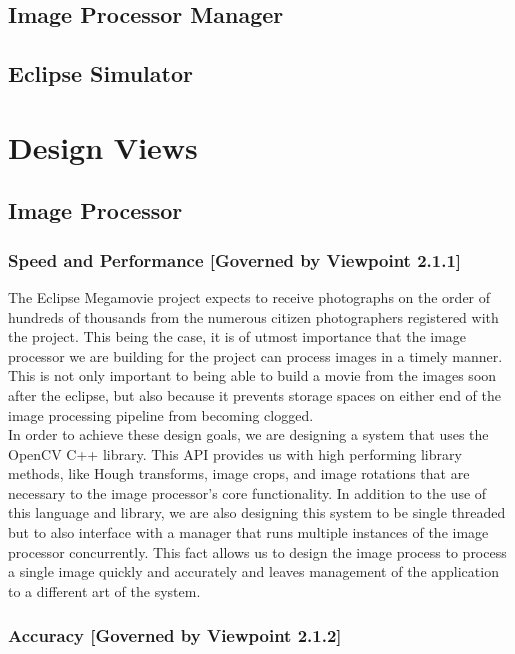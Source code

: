 \documentclass[10pt, onecolumn, draftclsnofoot, letterpaper, compsoc]{IEEEtran}
\begin{document}
\subsection{Image Processor Manager}

\subsection{Eclipse Simulator}


\section{Design Views}

\subsection{Image Processor}

\subsubsection{Speed and Performance [Governed by Viewpoint 2.1.1]}

The Eclipse Megamovie project expects to receive photographs on the order of
hundreds of thousands from the numerous citizen photographers registered with
the project. This being the case, it is of utmost importance that the image
processor we are building for the project can process images in a timely manner.
This is not only important to being able to build a movie from the images soon
after the eclipse, but also because it prevents storage spaces on either end of
the image processing pipeline from becoming clogged. \\

In order to achieve these design goals, we are designing a system that uses the
OpenCV C++ library.  This API provides us with high performing library methods,
like Hough transforms, image crops, and image rotations that are necessary to
the image processor's core functionality. In addition to the use of this
language and library, we are also designing this system to be single threaded
but to also interface with a manager that runs multiple instances of the image
processor concurrently. This fact allows us to design the image process to
process a single image quickly and accurately and leaves management of the
application to a different art of the system.\\

\subsubsection{Accuracy [Governed by Viewpoint 2.1.2]}
\end{document}
